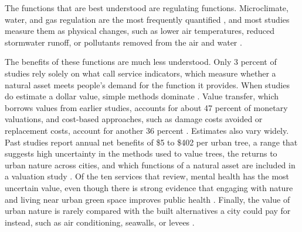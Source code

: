 \documentclass[12pt]{article}
\begin{document}
The functions that are best understood are regulating functions. Microclimate, water, and gas regulation are the most frequently quantified \citep{maReviewMethodsQuantifying2025}, and most studies measure them as physical changes, such as lower air temperatures, reduced stormwater runoff, or pollutants removed from the air and water \citep{veerkampReviewStudiesAssessing2021}.

The benefits of these functions are much less understood. Only 3 percent of studies rely solely on what \citet{veerkampReviewStudiesAssessing2021} call service indicators, which measure whether a natural asset meets people's demand for the function it provides. When studies do estimate a dollar value, simple methods dominate \citep{maReviewMethodsQuantifying2025}. Value transfer, which borrows values from earlier studies, accounts for about 47 percent of monetary valuations, and cost-based approaches, such as damage costs avoided or replacement costs, account for another 36 percent \citep{maReviewMethodsQuantifying2025}. Estimates also vary widely. Past studies report annual net benefits of \$5 to \$402 per urban tree, a range that suggests high uncertainty in the methods used to value trees, the returns to urban nature across cities, and which functions of a natural asset are included in a valuation study \citep{keelerSocialecologicalTechnologicalFactors2019}. Of the ten services that \citet{keelerSocialecologicalTechnologicalFactors2019} review, mental health has the most uncertain value, even though there is strong evidence that engaging with nature and living near urban green space improves public health \citep{mcphearsonGlobalSynthesisRegional2025}. Finally, the value of urban nature is rarely compared with the built alternatives a city could pay for instead, such as air conditioning, seawalls, or levees \citep{keelerSocialecologicalTechnologicalFactors2019}.
\end{document}
